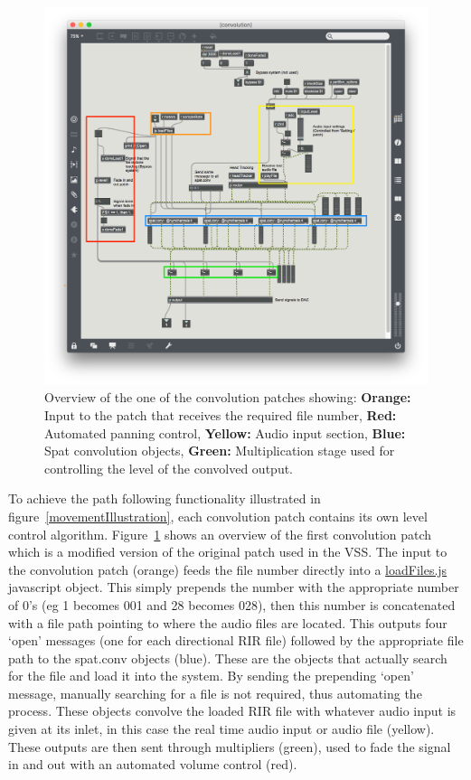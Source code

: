 \documentclass[../../main.tex]{subfiles}
\begin{document}
			\begin{figure}[t]
				\centerline{\includegraphics[scale = 0.4]{Sections/Implementation/Max/images/Max/Iteration3/convPatch_edit.png}}
				\caption{Overview of the one of the convolution patches showing: \textbf{Orange:} Input to the patch that receives the required file number, \textbf{Red:} Automated panning control, \textbf{Yellow:} Audio input section, \textbf{Blue:} Spat convolution objects, \textbf{Green:} Multiplication stage used for controlling the level of the convolved output.}
				\label{convPatch}
			\end{figure}

			To achieve the path following functionality illustrated in figure~\ref{movementIllustration}, each convolution patch contains its own level control algorithm. Figure~\ref{convPatch} shows an overview of the first convolution patch which is a modified version of the original patch used in the \ac{VSS}. The input to the convolution patch (orange) feeds the file number directly into a \href{http://lt669.github.io/code/javascript/html/loadFiles.html}{loadFiles.js} javascript object. This simply prepends the number with the appropriate number of 0's (eg 1 becomes 001 and 28 becomes 028), then this number is concatenated with a file path pointing to where the audio files are located. This outputs four `open' messages (one for each directional \ac{RIR} file)  followed by the appropriate file path to the spat.conv objects (blue). These are the objects that actually search for the file and load it into the system. By sending the prepending `open' message, manually searching for a file is not required, thus automating the process. These objects convolve the loaded \ac{RIR} file with whatever audio input is given at its inlet, in this case the real time audio input or audio file (yellow). These outputs are then sent through multipliers (green), used to fade the signal in and out with an automated volume control (red).
		 	
\end{document}
